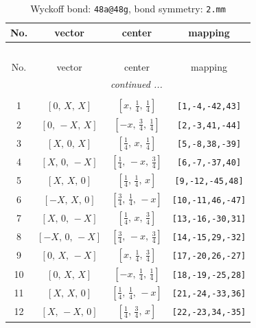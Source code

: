 \documentclass[fleqn,8pt]{jsarticle}
\begin{document}
\begin{longtable}{cccc}
\caption{Wyckoff bond: {\tt 48a@48g}, bond symmetry: {\tt 2.mm}}
 \\
 \hline \hline
No. & vector & center & mapping \\ \hline \endfirsthead

\multicolumn{3}{l}{\tablename\ \thetable{}} \\
 \hline \hline
No. & vector & center & mapping \\ \hline \endhead

 \hline \hline
\multicolumn{3}{r}{\footnotesize\it continued ...} \\ \endfoot

 \hline \hline
\multicolumn{3}{r}{} \\ \endlastfoot

1 & $\left[ 0,\, X,\, X \right]$ & $\left[ x,\, \frac{1}{4},\, \frac{1}{4} \right]$ & {\tt [1,-4,-42,43]} \\ \hline
2 & $\left[ 0,\, - X,\, X \right]$ & $\left[ - x,\, \frac{3}{4},\, \frac{1}{4} \right]$ & {\tt [2,-3,41,-44]} \\ \hline
3 & $\left[ X,\, 0,\, X \right]$ & $\left[ \frac{1}{4},\, x,\, \frac{1}{4} \right]$ & {\tt [5,-8,38,-39]} \\ \hline
4 & $\left[ X,\, 0,\, - X \right]$ & $\left[ \frac{1}{4},\, - x,\, \frac{3}{4} \right]$ & {\tt [6,-7,-37,40]} \\ \hline
5 & $\left[ X,\, X,\, 0 \right]$ & $\left[ \frac{1}{4},\, \frac{1}{4},\, x \right]$ & {\tt [9,-12,-45,48]} \\ \hline
6 & $\left[ - X,\, X,\, 0 \right]$ & $\left[ \frac{3}{4},\, \frac{1}{4},\, - x \right]$ & {\tt [10,-11,46,-47]} \\ \hline
7 & $\left[ X,\, 0,\, - X \right]$ & $\left[ \frac{1}{4},\, x,\, \frac{3}{4} \right]$ & {\tt [13,-16,-30,31]} \\ \hline
8 & $\left[ - X,\, 0,\, - X \right]$ & $\left[ \frac{3}{4},\, - x,\, \frac{3}{4} \right]$ & {\tt [14,-15,29,-32]} \\ \hline
9 & $\left[ 0,\, X,\, - X \right]$ & $\left[ x,\, \frac{1}{4},\, \frac{3}{4} \right]$ & {\tt [17,-20,26,-27]} \\ \hline
10 & $\left[ 0,\, X,\, X \right]$ & $\left[ - x,\, \frac{1}{4},\, \frac{1}{4} \right]$ & {\tt [18,-19,-25,28]} \\ \hline
11 & $\left[ X,\, X,\, 0 \right]$ & $\left[ \frac{1}{4},\, \frac{1}{4},\, - x \right]$ & {\tt [21,-24,-33,36]} \\ \hline
12 & $\left[ X,\, - X,\, 0 \right]$ & $\left[ \frac{1}{4},\, \frac{3}{4},\, x \right]$ & {\tt [22,-23,34,-35]} \\
\end{longtable}
\end{document}
